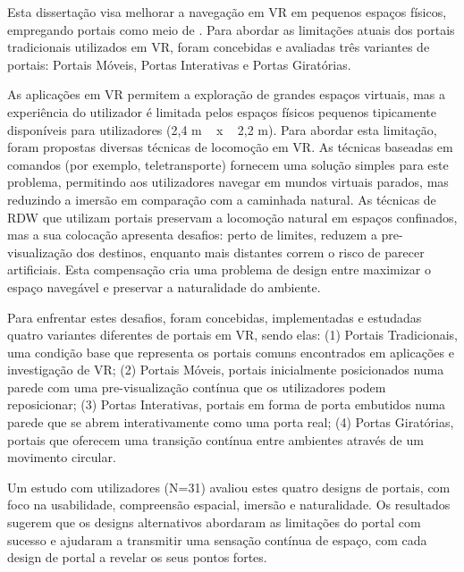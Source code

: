
\setlength{\parindent}{1.5em}
\setlength{\parskip}{0pt}


%

Esta dissertação visa melhorar a navegação em \gls{VR} em pequenos espaços físicos, empregando portais como meio de .
Para abordar as limitações atuais dos portais tradicionais utilizados em \gls{VR}, foram concebidas e avaliadas três variantes de 
portais: Portais Móveis, Portas Interativas e Portas Giratórias.

As aplicações em \gls{VR} permitem a exploração de grandes espaços virtuais, mas a experiência do utilizador é limitada pelos espaços 
físicos pequenos tipicamente disponíveis para utilizadores (2,4 m ~ x ~ 2,2 m).
Para abordar esta limitação, foram propostas diversas técnicas de locomoção em \gls{VR}. As técnicas baseadas em comandos 
(por exemplo, teletransporte) fornecem uma solução simples para este problema, permitindo aos utilizadores navegar em mundos 
virtuais parados, mas reduzindo a imersão em comparação com a caminhada natural.
As técnicas de \gls{RDW} que utilizam portais preservam a locomoção natural em espaços confinados,
mas a sua colocação apresenta desafios: perto de limites, reduzem a pre-visualização dos destinos, enquanto mais 
distantes correm o risco de parecer artificiais.
Esta compensação cria uma problema de design entre maximizar o espaço navegável e preservar a naturalidade do ambiente.

Para enfrentar estes desafios,
foram concebidas, implementadas e estudadas quatro variantes diferentes de portais em \gls{VR}, sendo elas:
(1) Portais Tradicionais, uma condição base que representa os portais comuns encontrados em aplicações e investigação de \gls{VR};
(2) Portais Móveis, portais inicialmente posicionados numa parede com uma pre-visualização contínua que os utilizadores podem reposicionar;
(3) Portas Interativas, portais em forma de porta embutidos numa parede que se abrem interativamente como uma porta real;
(4) Portas Giratórias, portais que oferecem uma transição contínua entre ambientes através de um movimento circular.

Um estudo com utilizadores (N=31) avaliou estes quatro designs de portais, com foco na usabilidade, compreensão espacial, 
imersão e naturalidade. Os resultados sugerem que os designs alternativos abordaram as limitações do portal com 
sucesso e ajudaram a transmitir uma sensação contínua de espaço, com cada design de portal a revelar os seus pontos fortes.

